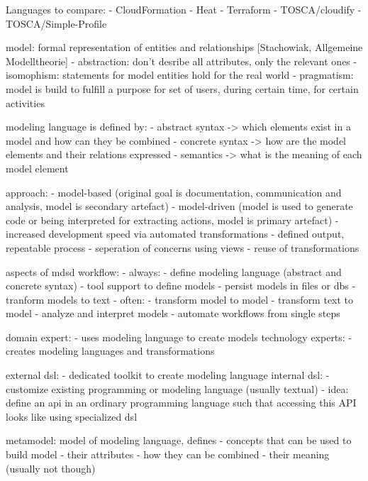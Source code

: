 
Languages to compare:
- CloudFormation
- Heat
- Terraform
- TOSCA/cloudify
- TOSCA/Simple-Profile

model: formal representation of entities and relationships [Stachowiak, Allgemeine Modelltheorie]
  - abstraction: don't desribe all attributes, only the relevant ones
  - isomophism: statements for model entities hold for the real world
  - pragmatism: model is build to fulfill a purpose for set of users, during certain time, for certain activities

modeling language is defined by:
- abstract syntax -> which elements exist in a model and how can they be combined
- concrete syntax -> how are the model elements and their relations expressed
- semantics -> what is the meaning of each model element

approach:
- model-based (original goal is documentation, communication and analysis, model is secondary artefact)
- model-driven (model is used to generate code or being interpreted for extracting actions, model is primary artefact)
  - increased development speed via automated transformations
  - defined output, repeatable process
  - seperation of concerns using views
  - reuse of transformations

aspects of mdsd workflow:
- always:
  - define modeling language (abstract and concrete syntax)
  - tool support to define models
  - persist models in files or dbs
  - tranform models to text
- often:
  - transform model to model
  - transform text to model
  - analyze and interpret models
  - automate workflows from single steps


domain expert:
- uses modeling language to create models
technology experts:
- creates modeling languages and transformations

external dsl:
- dedicated toolkit to create modeling language
internal dsl:
- customize existing programming or modeling language (usually textual)
- idea: define an api in an ordinary programming language such that accessing this API looks like using specialized dsl

metamodel: model of modeling language, defines
- concepts that can be used to build model
- their attributes
- how they can be combined
- their meaning (usually not though)

